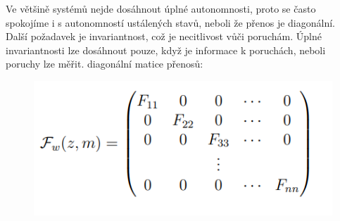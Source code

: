 Ve většině systémů nejde dosáhnout úplné autonomnosti, proto se často spokojíme i s autonomností ustálených stavů, neboli že přenos je diagonální.\\
Další požadavek je invariantnost, což je necitlivost vůči poruchám. Úplné invariantnosti lze dosáhnout pouze, když je informace k poruchách, neboli poruchy lze měřit.
diagonální matice přenosů:

\begin{figure}[H]
    \includegraphics*[scale = 1]{images/DiagonalniMaticePrenosu.png}
\end{figure}


